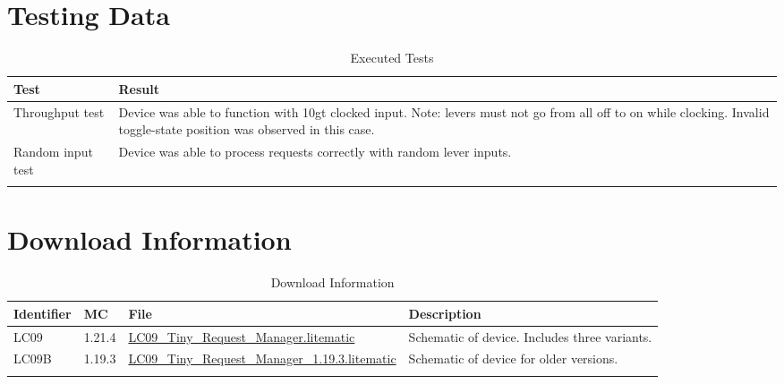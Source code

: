 \documentclass[10pt]{datasheet}
\begin{document}
\section{Testing Data}
\begin{table}[H]
\caption{Executed Tests}
\begin{tabularx}{\textwidth}{l | X}
    \thickhline
    \textbf{Test} & \textbf{Result} \\
    \hline
    Throughput test & Device was able to function with 10gt clocked input. Note: levers must not go from all off to on while clocking. Invalid toggle-state position was observed in this case. \\
    \hline
    Random input test & Device was able to process requests correctly with random lever inputs. \\
    \thickhline
\end{tabularx}
\end{table}

\section{Download Information}
\begin{table}[H]
    \caption{Download Information}
    \begin{tabularx}{\textwidth}{l | l | l | X}
        \thickhline
        \textbf{Identifier} & \textbf{MC} & \textbf{File} & \textbf{Description} \\
        \hline
        LC09 & 1.21.4 & \href{https://github.com/Soontech-Annals/Archive/blob/2b73adfd252c5e2cf9d202454dbef78a586bc482/Archive/logic-and-computation/LC09\%20Tiny\%20Request\%20Manager/LC09\_Tiny\_Request\_Manager.litematic?raw=1}{LC09\_Tiny\_Request\_Manager.litematic} & Schematic of device. Includes three variants. \\
        \hline
        LC09B & 1.19.3 & \href{https://github.com/Soontech-Annals/Archive/blob/2b73adfd252c5e2cf9d202454dbef78a586bc482/Archive/logic-and-computation/LC09\%20Tiny\%20Request\%20Manager/LC09\_Tiny\_Request\_Manager\_1.19.3.litematic?raw=1}{LC09\_Tiny\_Request\_Manager\_1.19.3.litematic} & Schematic of device for older versions. \\
        \hline
        \thickhline
    \end{tabularx}
\end{table}
\end{document}
